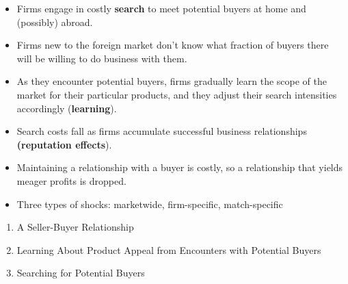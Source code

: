 \documentclass[notes=show]{beamer}
\begin{document}
\begin{frame}%


\begin{itemize}
\item Firms engage in costly \textbf{search} to meet potential buyers at
home and (possibly) abroad.

\item Firms new to the foreign market don't know what fraction of buyers
there will be willing to do business with them.

\item As they encounter potential buyers, firms gradually learn the scope of
the market for their particular products, and they adjust their search
intensities accordingly (\textbf{learning}).

\item Search costs fall as firms accumulate successful business
relationships \textbf{(reputation effects}).

\item Maintaining a relationship with a buyer is costly, so a relationship
that yields meager profits is dropped.

\item Three types of shocks: marketwide, firm-specific, match-specific
\end{itemize}

\end{frame}%
\begin{frame}%


\begin{enumerate}
\item A Seller-Buyer Relationship

\item Learning About Product Appeal from Encounters with Potential Buyers

\item Searching for Potential Buyers
\end{enumerate}

\end{frame}%
\end{document}
